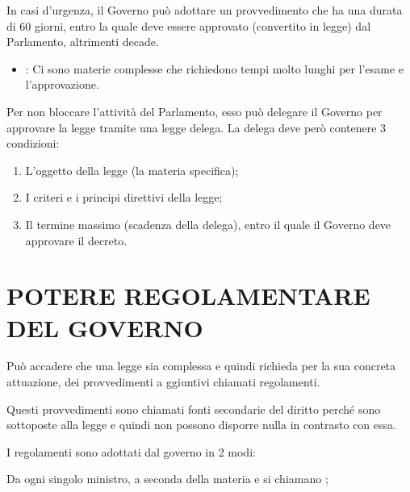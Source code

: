 \documentclass[letterpaper,10pt,italian]{sphinxmanual}
\begin{document}
\sphinxAtStartPar
In casi d’urgenza, il Governo può adottare un provvedimento che ha una durata di 60 giorni, entro la quale deve essere approvato (convertito in legge) dal Parlamento, altrimenti decade.
\begin{itemize}
\item {} 
\sphinxAtStartPar
{}: Ci sono materie complesse che richiedono tempi molto lunghi per l’esame e l’approvazione.

\end{itemize}

\sphinxAtStartPar
Per non bloccare l’attività del Parlamento, esso può delegare il Governo per approvare la legge tramite una legge delega. La delega deve però contenere 3 condizioni:
\begin{enumerate}
%
\item {} 
\sphinxAtStartPar
L’oggetto della legge (la materia specifica);

\item {} 
\sphinxAtStartPar
I criteri e i principi direttivi della legge;

\item {} 
\sphinxAtStartPar
Il termine massimo (scadenza della delega), entro il quale il Governo deve approvare il decreto.

\end{enumerate}

\sphinxstepscope


\chapter{POTERE REGOLAMENTARE DEL GOVERNO}
\label{\detokenize{POTERE REGOLAMENTARE DEL GOVERNO:potere-regolamentare-del-governo}}\label{\detokenize{POTERE REGOLAMENTARE DEL GOVERNO::doc}}
\sphinxAtStartPar
Può accadere che una legge sia complessa e quindi richieda per la sua concreta attuazione, dei provvedimenti a
ggiuntivi chiamati regolamenti.

\sphinxAtStartPar
Questi provvedimenti sono chiamati fonti secondarie del diritto perché sono sottoposte alla legge e quindi non possono disporre nulla in contrasto con essa.

\sphinxAtStartPar
I regolamenti sono adottati dal governo in 2 modi:

\sphinxAtStartPar
Da ogni singolo ministro, a seconda della materia e si chiamano ;
\end{document}
